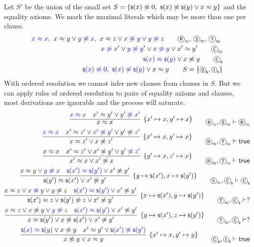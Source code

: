 \begin{example}\label{ex:nat:ordres}
	Let \( S' \) be the union of the small set 
	\( S = \{ \mathsf{s}(x)\not\approx 0,{\ }\mathsf{s}(x)\not\approx\mathsf{s}(y)\lor x\approx y \} \) 
	and the equality axioms. We mark the maximal literals which may be more than one per clause.
	\begin{align*}
	{\colN x \mEQ x},\
	x \mEQ y \lor {\colN y \mNE x},\
	x \mEQ z \lor {\colN x \mNE y} \lor {\colN y\mNE z}
\tag*{\(\axiom{R}_\mEQ,\,\axiom{S}_\mEQ,\,\axiom{T}_\mEQ \) }
\\
	{\colN x \mNE x'} \lor {\colN y \mNE y'} \lor {\colN x \mNE y} \lor {x' \mEQ y'}
	\tag*{\(\axiom{C}_\mEQ\)}
\\
	{\colN \msucc(x) \mEQ \msucc(y)} \lor x\mNE y
	\tag*{\(\axiom{C}_\msucc \)}
\\
	{\colN \msucc(x)\mNE 0},\
	{\colN \msucc(x) \mNE \msucc(y)} \lor x \mEQ y
\tag*{\( S = \{ \axiom{0}_\msucc, \axiom{I}_\msucc \} \)}
	\end{align*}
	With ordered resolution we cannot infer new clauses from clauses in \( S \).
	But we can apply rules of ordered resolution to pairs of equality axioms and clauses,
	most derivations are ignorable and the process will saturate.
	\begin{align*}
\infer[ \{ x'\mapsto x, y'\mapsto x\}]
{x \mEQ x}
{{\colN x \mEQ x} & x' \mEQ y' \lor {\colN y' \mNE x'}}
\tag*{\( \axiom{R}_\mEQ,\axiom{S}_\mEQ\proves \axiom{R}_\mEQ\)}
\\
\infer[ \{ x'\mapsto x,y'\mapsto x \}]
{x\mEQ z'\lor x\mNE z' }
{{\colN x \mEQ x} & x' \mEQ z' \lor {\colN x' \mNE y'} \lor {y'\mNE z'}}
\tag*{\( \axiom{R}_\mEQ,\axiom{T}_\mEQ\proves\true \)}
\\
\infer[ \{ y'\mapsto x, z'\mapsto x \}]
{x'\mEQ x\lor x'\mNE x }
{{\colN x \mEQ x} & x' \mEQ z' \lor {x' \mNE y'} \lor {\colN y'\mNE z'}}
\tag*{\( \axiom{R}_\mEQ, \axiom{T}_\mEQ\proves\true \)}
\\
\infer[ \{ y\mapsto \msucc(x'), x\mapsto\msucc(y')\}]
{\msucc(y')\mEQ\msucc(x')\lor x'\mNE y'}
{x \mEQ y \lor {\colN y \mNE x} & {\colN \msucc(x') \mEQ \msucc(y')} \lor x'\mNE y'}
\tag*{\( \axiom{S}_\mEQ,\axiom{C}_\msucc\proves \axiom{C}_\msucc \)}
\\
\infer[ \{ x\mapsto\msucc(x'),y\mapsto\msucc(y')\}]
{\msucc(x')\mEQ z\lor \msucc(y')\mNE z \lor x'\mNE y'}
{x \mEQ z \lor {\colN x \mNE y} \lor {y\mNE z} & {\colN \msucc(x') \mEQ \msucc(y')} \lor x'\mNE y'}
\tag*{\( \axiom{T}_\mEQ,\axiom{C}_\msucc\proves ? \)}
\\
\infer[ \{ y\mapsto\msucc(x'),z\mapsto\msucc(y')\}]
{x\mEQ\msucc(y')\lor x\mNE\msucc(x')\lor x'\mNE y'}
{x \mEQ z \lor {x \mNE y} \lor {\colN y\mNE z} & {\colN \msucc(x') \mEQ \msucc(y')} \lor x'\mNE y'}
\tag*{\( \axiom{T}_\mEQ,\axiom{C}_\msucc\proves ? \)}
\\
\infer[ \{ x'\mapsto x, y'\mapsto y\}]
{x\mNE y\lor x\mEQ y}
{{\colN \msucc(x) \mEQ \msucc(y)} \lor x\mNE y & x' \mEQ y' \lor {\colN \msucc(x') \mNE \msucc(y')}}
\tag*{\( \axiom{C}_\msucc,\axiom{I}_\msucc\proves\true \)}
\\
	\end{align*}
\end{example}

